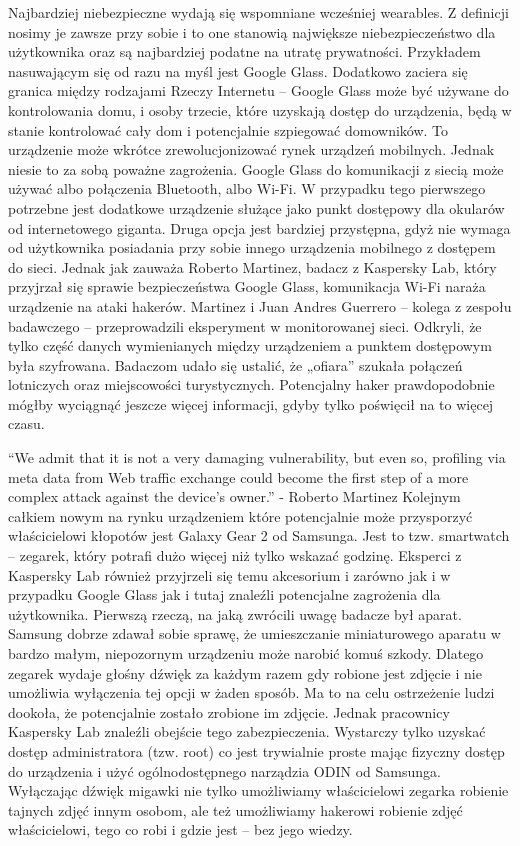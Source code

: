 \documentclass[brudnopis]{xmgr}
\begin{document}
Najbardziej niebezpieczne wydają się wspomniane wcześniej wearables. Z definicji nosimy je zawsze przy sobie i to one stanowią największe niebezpieczeństwo dla użytkownika oraz są najbardziej podatne na utratę prywatności. Przykładem nasuwającym się od razu na myśl jest Google Glass. Dodatkowo zaciera się granica między rodzajami Rzeczy Internetu – Google Glass może być używane do kontrolowania domu, i osoby trzecie, które uzyskają dostęp do urządzenia, będą w stanie kontrolować cały dom i potencjalnie  szpiegować domowników.
To urządzenie może wkrótce zrewolucjonizować rynek urządzeń mobilnych. Jednak niesie to za sobą poważne zagrożenia. Google Glass do komunikacji z siecią może używać albo połączenia Bluetooth, albo Wi-Fi. W przypadku tego pierwszego potrzebne jest dodatkowe urządzenie służące jako punkt dostępowy dla okularów od internetowego giganta. Druga opcja jest bardziej przystępna, gdyż nie wymaga od użytkownika posiadania przy sobie innego urządzenia mobilnego z dostępem do sieci. Jednak jak zauważa Roberto Martinez, badacz z Kaspersky Lab, który przyjrzał się sprawie bezpieczeństwa Google Glass, komunikacja Wi-Fi naraża urządzenie na ataki hakerów. Martinez i Juan Andres Guerrero – kolega z zespołu badawczego – przeprowadzili eksperyment w monitorowanej sieci. Odkryli, że tylko część danych wymienianych między urządzeniem a punktem dostępowym była szyfrowana. Badaczom udało się ustalić, że „ofiara” szukała połączeń lotniczych oraz miejscowości turystycznych. Potencjalny haker prawdopodobnie mógłby wyciągnąć jeszcze więcej informacji, gdyby tylko poświęcił na to więcej czasu.

“We admit that it is not a very damaging vulnerability, but even so, profiling via meta data from Web traffic exchange could become the first step of a more complex attack against the device’s owner.” - Roberto Martinez
Kolejnym całkiem nowym na rynku urządzeniem które potencjalnie może przysporzyć właścicielowi kłopotów jest Galaxy Gear 2 od Samsunga. Jest to tzw. smartwatch – zegarek, który potrafi dużo więcej niż tylko wskazać godzinę. Eksperci z Kaspersky Lab również przyjrzeli się temu akcesorium i zarówno jak i w przypadku Google Glass jak i tutaj znaleźli potencjalne zagrożenia dla użytkownika. Pierwszą rzeczą, na jaką zwrócili uwagę badacze był aparat. Samsung dobrze zdawał sobie sprawę, że umieszczanie miniaturowego aparatu w bardzo małym, niepozornym urządzeniu może narobić komuś szkody. Dlatego zegarek wydaje głośny dźwięk za każdym razem gdy robione jest zdjęcie i nie umożliwia wyłączenia tej opcji w żaden sposób. Ma to na celu ostrzeżenie ludzi dookoła, że potencjalnie zostało zrobione im zdjęcie. Jednak pracownicy Kaspersky Lab znaleźli obejście tego zabezpieczenia. Wystarczy tylko uzyskać dostęp administratora (tzw. root) co jest trywialnie proste mając fizyczny dostęp do urządzenia i użyć ogólnodostępnego narządzia ODIN od Samsunga. Wyłączając dźwięk migawki nie tylko umożliwiamy właścicielowi zegarka robienie tajnych zdjęć innym osobom, ale też umożliwiamy hakerowi robienie zdjęć właścicielowi, tego co robi i gdzie jest – bez jego wiedzy.
\end{document}
